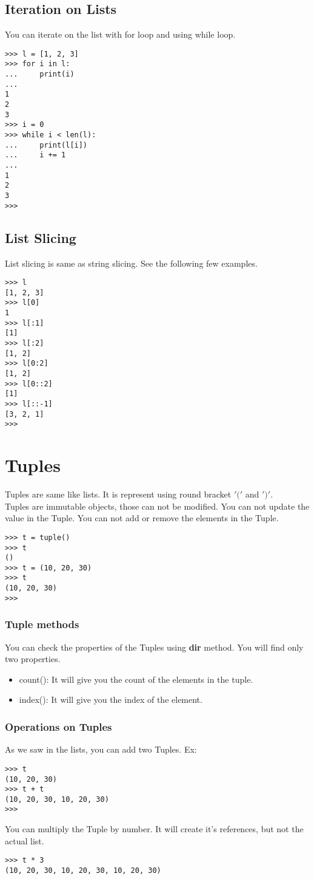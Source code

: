 \documentclass[letterpaper,12pt]{book}
\begin{document}
\subsection{Iteration on Lists}
You can iterate on the list with for loop and using while loop.
\begin{verbatim}
>>> l = [1, 2, 3]
>>> for i in l:
...     print(i)
... 
1
2
3
>>> i = 0
>>> while i < len(l):
...     print(l[i])
...     i += 1
... 
1
2
3
>>>
\end{verbatim}
\subsection{List Slicing}
List slicing is same as string slicing. See the following few examples.
\begin{verbatim}
>>> l
[1, 2, 3]
>>> l[0]
1
>>> l[:1]
[1]
>>> l[:2]
[1, 2]
>>> l[0:2]
[1, 2]
>>> l[0::2]
[1]
>>> l[::-1]
[3, 2, 1]
>>> 
\end{verbatim}

\section{Tuples}
Tuples are same like lists. It is represent using round bracket $'('$ and $')'$.\\
Tuples are immutable objects, those can not be modified.
You can not update the value in the Tuple.
You can not add or remove the elements in the Tuple.
\begin{verbatim}
>>> t = tuple()
>>> t
()
>>> t = (10, 20, 30)
>>> t
(10, 20, 30)
>>>
\end{verbatim}
\subsubsection{Tuple methods}
You can check the properties of the Tuples using \textbf{dir} method. You will find only two properties.
\begin{itemize}
\item count(): It will give you the count of the elements in the tuple.
\item index(): It will give you the index of the element.
\end{itemize}
\subsubsection{Operations on Tuples}
As we saw in the lists, you can add two Tuples. Ex:
\begin{verbatim}
>>> t
(10, 20, 30)
>>> t + t
(10, 20, 30, 10, 20, 30)
>>>
\end{verbatim}
You can multiply the Tuple by number. It will create it's references, but not the actual list.
\begin{verbatim}
>>> t * 3
(10, 20, 30, 10, 20, 30, 10, 20, 30)
\end{verbatim}
\end{document}
